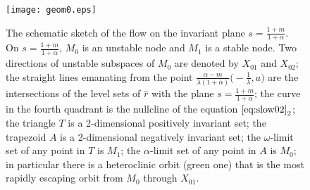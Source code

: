 \documentclass[a4paper,11pt]{article}
\theoremstyle{remark}
\begin{document}
\begin{figure}[ht]
 \centering
  \texttt{[image: geom0.eps]} \label{fig:flow0}
  \caption{The schematic sketch of the flow on the invariant plane $s=\frac{1+m}{1+\alpha}$.   On $s=\frac{1+m}{1+\alpha}$, $M_0$ is an unstable node and $M_1$ is a stable node. Two directions of unstable subspaces of $M_0$ are denoted by $X_{01}$ and $X_{02}$; the straight lines emanating from the 
  point $\frac{\alpha-m}{\lambda(1+\alpha)}\big(-\frac{1}{\lambda},a\big)$ are the intersections of the level sets of $\hat{r}$ 
  with the plane $s=\frac{1+m}{1+\alpha}$; the curve in the fourth quadrant is the nullcline of the equation $\eqref{eq:slow02}_2$; the triangle $T$ is a 2-dimensional positively invariant set; the trapezoid $A$ is a 2-dimensional negatively invariant set; the $\omega$-limit set of any point in $T$ is $M_1$; 
  the $\alpha$-limit set of any point in $A$ is $M_0$; in particular there is a heteroclinic orbit (green one) that is the most rapidly escaping orbit from $M_0$ through $X_{01}$.  } 
\end{figure}
\end{document}
